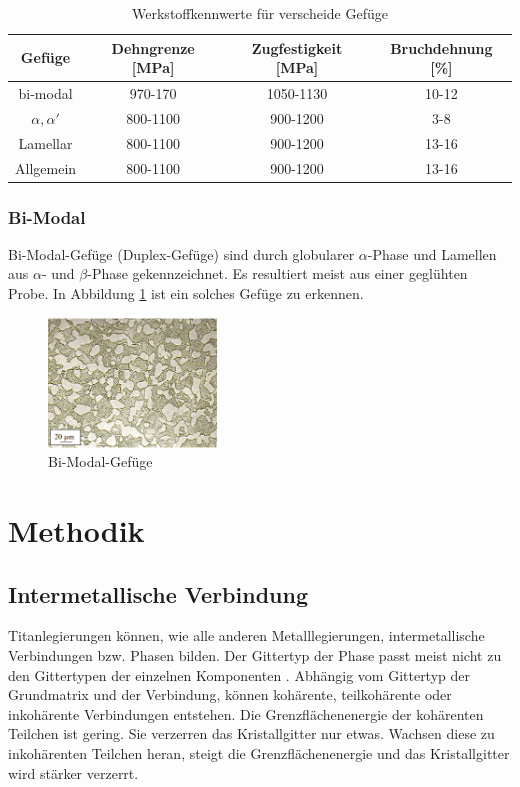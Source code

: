 \documentclass[a4paper, 11pt]{tubsreprt}
\begin{document}
\begin{table}
\begin{tabular}{c|c|c|c}
Gefüge & Dehngrenze [MPa] & Zugfestigkeit [MPa] & Bruchdehnung [\%] \\
\hline
bi-modal &	970-170 & 1050-1130 & 10-12 \\
\hline
{$\alpha, \alpha'$} & 800-1100 & 900-1200 & 3-8 \\
\hline
Lamellar & 800-1100 & 900-1200 & 13-16 \\
\hline
Allgemein & 800-1100 & 900-1200 & 13-16 \\

\end{tabular}
\label{Tabelle Spannungen Gefüge}
\caption{Werkstoffkennwerte für verscheide Gefüge}
\end{table}
\subsection{Bi-Modal}
Bi-Modal-Gefüge (Duplex-Gefüge) sind durch globularer $\alpha$-Phase und Lamellen aus $\alpha$- und $\beta$-Phase gekennzeichnet. Es resultiert meist aus einer geglühten Probe.  In Abbildung \ref{bimodal} ist ein solches Gefüge zu erkennen. 
\begin{figure}
\centering
\includegraphics[width=0.4\textwidth]{Bilder/Duplexgefuege.PNG}
\caption[Bi-Modal-Gefüge]{Bi-Modal-Gefüge\cite{Werkstoffdesign2012}}
\label{bimodal}
\end{figure}

\chapter{Methodik}
\section{Intermetallische Verbindung}
Titanlegierungen können, wie alle anderen Metalllegierungen, intermetallische Verbindungen bzw. Phasen bilden. Der Gittertyp der Phase passt meist nicht zu den Gittertypen der einzelnen Komponenten \cite[vgl.]{Domke1986}. Abhängig vom Gittertyp der Grundmatrix und der Verbindung,  können kohärente, teilkohärente oder inkohärente Verbindungen entstehen. Die Grenzflächenenergie der kohärenten Teilchen ist gering. Sie verzerren das Kristallgitter nur etwas. Wachsen diese zu inkohärenten Teilchen heran, steigt die Grenzflächenenergie und das Kristallgitter wird stärker verzerrt.
\end{document}
